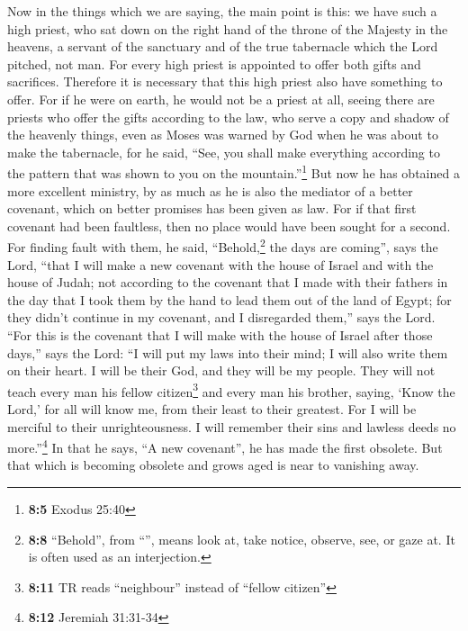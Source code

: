  Now in the things which we are saying, the main point is
this: we have such a high priest, who sat down on the right hand of the
throne of the Majesty in the heavens,  a servant of the
sanctuary and of the true tabernacle which the Lord pitched, not man.
 For every high priest is appointed to offer both gifts
and sacrifices. Therefore it is necessary that this high priest also
have something to offer.  For if he were on earth, he
would not be a priest at all, seeing there are priests who offer the
gifts according to the law,  who serve a copy and shadow
of the heavenly things, even as Moses was warned by God when he was
about to make the tabernacle, for he said, ``See, you shall make
everything according to the pattern that was shown to you on the
mountain.''\footnote{\textbf{8:5} Exodus 25:40}  But now
he has obtained a more excellent ministry, by as much as he is also the
mediator of a better covenant, which on better promises has been given
as law.  For if that first covenant had been faultless,
then no place would have been sought for a second.  For
finding fault with them, he said, ``Behold,\footnote{\textbf{8:8}
  ``Behold'', from ``'', means look at, take notice,
  observe, see, or gaze at. It is often used as an interjection.} the
days are coming'', says the Lord, ``that I will make a new covenant with
the house of Israel and with the house of Judah;  not
according to the covenant that I made with their fathers in the day that
I took them by the hand to lead them out of the land of Egypt; for they
didn't continue in my covenant, and I disregarded them,'' says the Lord.
 ``For this is the covenant that I will make with the
house of Israel after those days,'' says the Lord: ``I will put my laws
into their mind; I will also write them on their heart. I will be their
God, and they will be my people.  They will not teach
every man his fellow citizen\footnote{\textbf{8:11} TR reads
  ``neighbour'' instead of ``fellow citizen''} and every man his
brother, saying, `Know the Lord,' for all will know me, from their least
to their greatest.  For I will be merciful to their
unrighteousness. I will remember their sins and lawless deeds no
more.''\footnote{\textbf{8:12} Jeremiah 31:31-34}  In
that he says, ``A new covenant'', he has made the first obsolete. But
that which is becoming obsolete and grows aged is near to vanishing
away.

